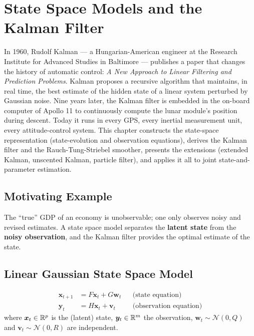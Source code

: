 \chapter{State Space Models and the Kalman Filter}
\label{ch:kalman}

In 1960, Rudolf Kalman --- a Hungarian-American engineer at the Research Institute for Advanced Studies in Baltimore --- publishes a paper that changes the history of automatic control: \emph{A New Approach to Linear Filtering and Prediction Problems}. Kalman proposes a recursive algorithm that maintains, in real time, the best estimate of the hidden state of a linear system perturbed by Gaussian noise. Nine years later, the Kalman filter is embedded in the on-board computer of Apollo 11 to continuously compute the lunar module's position during descent. Today it runs in every GPS, every inertial measurement unit, every attitude-control system. This chapter constructs the state-space representation (state-evolution and observation equations), derives the Kalman filter and the Rauch-Tung-Striebel smoother, presents the extensions (extended Kalman, unscented Kalman, particle filter), and applies it all to joint state-and-parameter estimation.

\section{Motivating Example}
The ``true'' GDP of an economy is unobservable; one only observes noisy and revised estimates. A state space model separates the \textbf{latent state} from the \textbf{noisy observation}, and the Kalman filter provides the optimal estimate of the state.

\section{Linear Gaussian State Space Model}

\begin{definition}
\begin{align}
\bm{x}_{t+1} &= F\bm{x}_t + G\bm{w}_t && \text{(state equation)} \label{eq:state}\\
\bm{y}_t &= H\bm{x}_t + \bm{v}_t && \text{(observation equation)} \label{eq:obs}
\end{align}
where $\bm{x}_t\in\mathbb{R}^p$ is the (latent) state, $\bm{y}_t\in\mathbb{R}^m$ the observation, $\bm{w}_t\sim\mathcal{N}(0,Q)$ and $\bm{v}_t\sim\mathcal{N}(0,R)$ are independent.
\end{definition}

